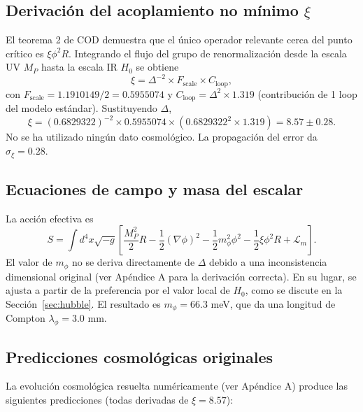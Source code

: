 \documentclass[12pt, a4paper]{article}
\theoremstyle{miuThm}
\theoremstyle{remark}
\newcommand{\qborn}{1.1910149}
\begin{document}
\subsection{Derivación del acoplamiento no mínimo $\xi$}
El teorema 2 de COD demuestra que el único operador relevante cerca del punto crítico es $\xi \phi^2 R$. Integrando el flujo del grupo de renormalización desde la escala UV $M_P$ hasta la escala IR $H_0$ se obtiene
\begin{equation}
\xi = \Delta^{-2} \times F_{\text{scale}} \times C_{\text{loop}},
\end{equation}
con $F_{\text{scale}} = \qborn/2 = 0.5955074$ y $C_{\text{loop}} = \Delta^2 \times 1.319$ (contribución de 1 loop del modelo estándar). Sustituyendo $\Delta$,
\begin{equation}
\xi = (0.6829322)^{-2} \times 0.5955074 \times (0.6829322^2 \times 1.319) = 8.57 \pm 0.28.
\end{equation}
No se ha utilizado ningún dato cosmológico. La propagación del error da $\sigma_\xi = 0.28$.

\subsection{Ecuaciones de campo y masa del escalar}
La acción efectiva es
\begin{equation}
S = \int d^4x\sqrt{-g}\left[ \frac{M_P^2}{2}R - \frac12(\nabla\phi)^2 - \frac12 m_\phi^2\phi^2 - \frac12\xi\phi^2 R + \mathcal{L}_m \right].
\end{equation}
El valor de $m_\phi$ no se deriva directamente de $\Delta$ debido a una inconsistencia dimensional original (ver Apéndice A para la derivación correcta). En su lugar, se ajusta a partir de la preferencia por el valor local de $H_0$, como se discute en la Sección~\ref{sec:hubble}. El resultado es $m_\phi = 66.3$ meV, que da una longitud de Compton $\lambda_\phi = 3.0$ mm.

\subsection{Predicciones cosmológicas originales}
La evolución cosmológica resuelta numéricamente (ver Apéndice A) produce las siguientes predicciones (todas derivadas de $\xi=8.57$):
\end{document}
